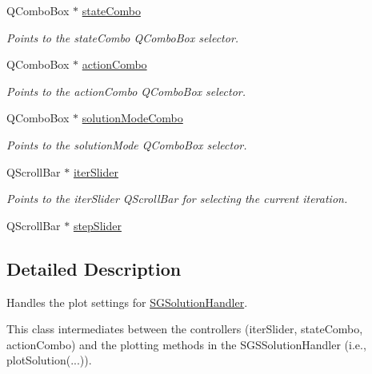 \begin{DoxyCompactItemize}
Q\+Combo\+Box $\ast$ \hyperlink{classSGPlotController__V2_ae574a3482d0384a05cf01437f9a53d72}{state\+Combo}
\begin{DoxyCompactList}\small\item\em Points to the state\+Combo Q\+Combo\+Box selector. \end{DoxyCompactList}\item 
\mbox{\label{classSGPlotController__V2_a82df7670748638185baae0955993c1b9}} 
Q\+Combo\+Box $\ast$ \hyperlink{classSGPlotController__V2_a82df7670748638185baae0955993c1b9}{action\+Combo}
\begin{DoxyCompactList}\small\item\em Points to the action\+Combo Q\+Combo\+Box selector. \end{DoxyCompactList}\item 
\mbox{\label{classSGPlotController__V2_a2c4499312a667fd442290f52fa561058}} 
Q\+Combo\+Box $\ast$ \hyperlink{classSGPlotController__V2_a2c4499312a667fd442290f52fa561058}{solution\+Mode\+Combo}
\begin{DoxyCompactList}\small\item\em Points to the solution\+Mode Q\+Combo\+Box selector. \end{DoxyCompactList}\item 
\mbox{\label{classSGPlotController__V2_a2581322e2e30b454448ad7a866d13491}} 
Q\+Scroll\+Bar $\ast$ \hyperlink{classSGPlotController__V2_a2581322e2e30b454448ad7a866d13491}{iter\+Slider}
\begin{DoxyCompactList}\small\item\em Points to the iter\+Slider Q\+Scroll\+Bar for selecting the current iteration. \end{DoxyCompactList}\item 
Q\+Scroll\+Bar $\ast$ \hyperlink{classSGPlotController__V2_a3524cbb0ad2dad23c0d2fa09dc2ab9f0}{step\+Slider}
\end{DoxyCompactItemize}


\subsection{Detailed Description}
Handles the plot settings for \hyperlink{classSGSolutionHandler}{S\+G\+Solution\+Handler}. 

This class intermediates between the controllers (iter\+Slider, state\+Combo, action\+Combo) and the plotting methods in the S\+G\+S\+Solution\+Handler (i.\+e., plot\+Solution(...)).

